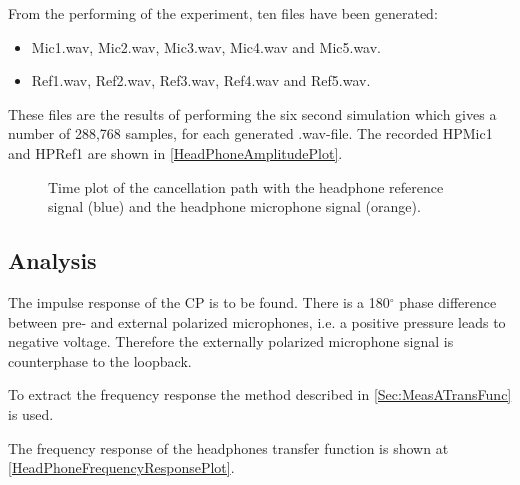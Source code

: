 From the performing of the experiment, ten files have been generated:
\begin{itemize}
	\item Mic1.wav, Mic2.wav, Mic3.wav, Mic4.wav and Mic5.wav.
	\item Ref1.wav, Ref2.wav, Ref3.wav, Ref4.wav and Ref5.wav.
\end{itemize}

These files are the results of performing the six second simulation which gives a number of 288,768 samples, for each generated .wav-file. 
The recorded HPMic1 and HPRef1 are shown in \autoref{HeadPhoneAmplitudePlot}.


\begin{figure}[H]
	\centering
	
	\caption{Time plot of the cancellation path with the headphone reference signal (blue) and the headphone microphone signal (orange).}
	\label{HeadPhoneAmplitudePlot}
\end{figure}


\subsection{Analysis}
The impulse response of the CP is to be found.
There is a 180$^\circ$ phase difference between pre- and external polarized microphones, i.e. a positive pressure leads to negative voltage. Therefore the externally polarized microphone signal is counterphase to the loopback. \cite{michandbook}

To extract the frequency response the method described in \autoref{Sec:MeasATransFunc} is used.


The frequency response of the headphones transfer function is shown at \autoref{HeadPhoneFrequencyResponsePlot}.

